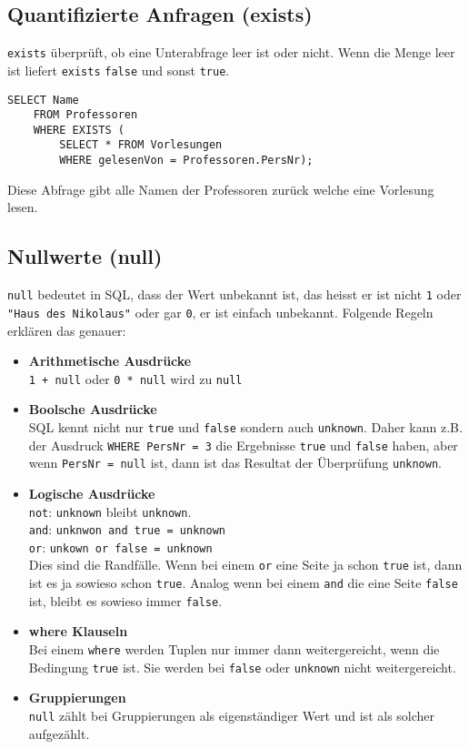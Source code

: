 \subsection{Quantifizierte Anfragen (exists)}

\texttt{exists} überprüft, ob eine Unterabfrage leer ist oder nicht. Wenn die Menge leer ist liefert \texttt{exists} \texttt{false} und sonst \texttt{true}.

\begin{lstlisting}[caption={SQL Beispiel mit Exists},label=lst:bsp_exists]
	SELECT Name
	FROM Professoren
	WHERE EXISTS (
	    SELECT * FROM Vorlesungen 
	    WHERE gelesenVon = Professoren.PersNr);
\end{lstlisting}

Diese Abfrage gibt alle Namen der Professoren zurück welche eine Vorlesung lesen.

\subsection{Nullwerte (null)}

\texttt{null} bedeutet in SQL, dass der Wert unbekannt ist, das heisst er ist nicht \texttt{1} oder \texttt{"Haus des Nikolaus"} oder gar \texttt{0}, er ist einfach unbekannt. Folgende Regeln erklären das genauer:

\begin{itemize}
  \item \textbf{Arithmetische Ausdrücke} \\
  \texttt{1 + null} oder \texttt{0 * null} wird zu \texttt{null}
  \item \textbf{Boolsche Ausdrücke} \\
  SQL kennt nicht nur \texttt{true} und \texttt{false} sondern auch \texttt{unknown}. Daher kann z.B. der Ausdruck \texttt{WHERE PersNr = 3} die Ergebnisse \texttt{true} und \texttt{false} haben, aber wenn \texttt{PersNr = null} ist, dann ist das Resultat der Überprüfung \texttt{unknown}.
  \item \textbf{Logische Ausdrücke} \\
  \texttt{not}: \texttt{unknown} bleibt \texttt{unknown}. \\
  \texttt{and}: \texttt{unknwon and true = unknown} \\
  \texttt{or}: \texttt{unkown or false = unknown} \\
  Dies sind die Randfälle. Wenn bei einem \texttt{or} eine Seite ja schon \texttt{true} ist, dann ist es ja sowieso schon \texttt{true}. Analog wenn bei einem \texttt{and} die eine Seite \texttt{false} ist, bleibt es sowieso immer \texttt{false}.
  \item \textbf{where Klauseln} \\
  Bei einem \texttt{where} werden Tuplen nur immer dann weitergereicht, wenn die Bedingung \texttt{true} ist. Sie werden bei \texttt{false} oder \texttt{unknown} nicht weitergereicht.
  \item \textbf{Gruppierungen} \\
  \texttt{null} zählt bei Gruppierungen als eigenständiger Wert und ist als solcher aufgezählt.
\end{itemize}

